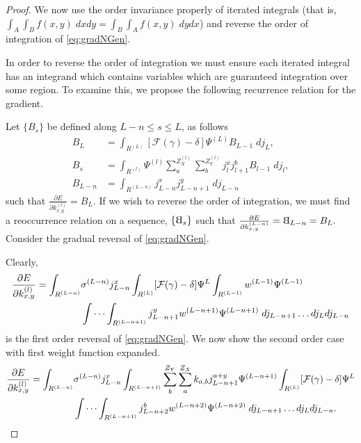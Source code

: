 \documentclass[titlepage, twoside]{article}
\numberwithin{equation}{subsection}
\numberwithin{theorem}{subsection}
\newcommand{\rotB}{\scalebox{-1}[1]{B}}
\begin{document}
\begin{proof}
  We now use the order invariance properly of iterated integrals (that is, $\int_A\int_B f(x,y)\;dxdy = \int_B\int_A f(x,y)\;dydx$) and reverse the order of integration of \eqref{eq:gradNGen}.

  In order to reverse the order of integration we must ensure each iterated integral has an integrand which contains variables which are guaranteed integration over some region. To examine this, we propose the following recurrence relation for the gradient. 

  Let $\{B_s\}$ be defined along $L -n \leq s \leq L$, as follows
  \begin{equation}
  \begin{aligned}
    B_L &= \int_{R^{(L)}} \left[\mathcal{F}(\gamma) - \delta\right] 
      \Psi^{(L)} B_{L-1} \;dj_L, \\
    B_s &= \int_{R^{(l)}} \Psi^{(l)}
     \sum_a^{Z^{(l)}_X} \sum_b^{Z^{(l)}_Y} j_l^a j_{l+1}^b B_{l-1} \; dj_l, \\
    B_{L-n} &= \int_{R^{(L-n)}} j_{L-n}^x j_{L-n+1}^y \; dj_{L-n}
  \end{aligned}
  \end{equation}
  such that $\frac{\partial E}{\partial k_{x,y}^{(l)}} = B_L$. If we wish to reverse the order of integration, we must find a reoccurrence relation on a sequence,
  $\{\rotB_s\}$  such that $\frac{\partial E}{\partial k_{x,y}^{(L-n)}} = \rotB_{L-n} = B_L.$ Consider the gradual reversal of \eqref{eq:gradNGen}.

  Clearly,
  \begin{equation} \label{eq:rev1}
  \begin{aligned}
    \frac{\partial E}{\partial k_{x,y}^{(l)}} =
      \int_{R^{(L-n)}}&  \sigma^{(L-n)} j^{x}_{L-n}
      \int_{R^{(L)}}[\mathcal{F}(\gamma)-\delta] \Psi^{L} 
      \int_{R^{(L-1)}} w^{(L-1)} \Psi^{(L-1)} \\ & 
      \idotsint_{R^{(L-n+1)}} j^{y}_{L-n+1}w^{(L-n+1)} \Psi^{(L-n+1)}  \; dj_{L-n+1}\dots dj_L dj_{L-n}
  \end{aligned}
  \end{equation} 
  is the first order reversal of \eqref{eq:gradNGen}. We now show the second order case with first weight function expanded.
  \begin{equation}\label{eq:rev2}
  \begin{aligned}
    \frac{\partial E}{\partial k_{x,y}^{(l)}} =
      \int_{R^{(L-n)}}&  \sigma^{(L-n)}  j^{x}_{L-n}
      \int_{R^{(L-n+1)}} \sum_b^{Z_Y} \sum_a^{Z_X} k_{a,b} j_{L-n+1}^{a+y} \Psi^{(L-n+1)}
      \int_{R^{(L)}}[\mathcal{F}(\gamma)-\delta] \Psi^{L} \\ & 
      \idotsint_{R^{(L-n+1)}} j^b_{L-n+2} w^{(L-n+2)} \Psi^{(L-n+2)}  \; dj_{L-n+1}\dots dj_L dj_{L-n}.
  \end{aligned}
  \end{equation}


\end{proof}
\end{document}
